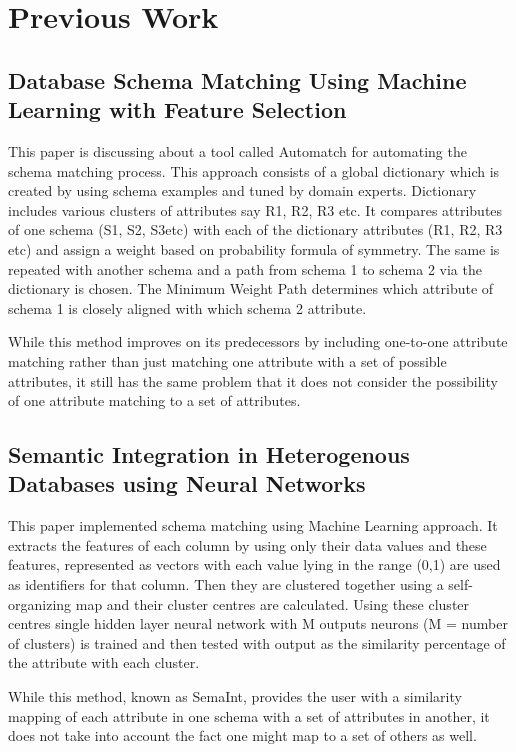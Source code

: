 \documentclass[conference]{IEEEtran}
\begin{document}
\section{Previous Work} 

\subsection*{\textbf{Database Schema Matching Using Machine Learning with Feature Selection}\cite{ref2}}
This paper is discussing about a tool called Automatch for automating the schema matching process. This approach consists of a global dictionary which is created by using schema examples and tuned by domain experts. Dictionary includes various clusters of attributes say R1, R2, R3 etc. It compares attributes of one schema (S1, S2, S3etc) with each of the dictionary attributes (R1, R2, R3 etc) and assign a weight based on probability formula of symmetry. The same is repeated with another schema and a path from schema 1 to schema 2 via the dictionary is chosen. The Minimum Weight Path determines which attribute of schema 1 is closely aligned with which schema 2 attribute.

While this method improves on its predecessors by including one-to-one attribute matching rather than just matching one attribute with a set of possible attributes, it still has the same problem that it does not consider the possibility of one attribute matching to a set of attributes.

\subsection*{\textbf{Semantic Integration in Heterogenous Databases using Neural Networks}\cite{ref1}}
This paper implemented schema matching using Machine Learning approach. It extracts the features of each column by using only their data values and these features, represented as vectors with each value lying in the range (0,1) are used as identifiers for that column. Then they are clustered together using a self-organizing map and their cluster centres are calculated. Using these cluster centres single hidden layer neural network with M outputs neurons (M = number of clusters) is trained and then tested with output as the similarity percentage of the attribute with each cluster.

While this method, known as SemaInt, provides the user with a similarity mapping of each attribute in one schema with a set of attributes in another, it does not take into account the fact one might map to a set of others as well.
\end{document}
